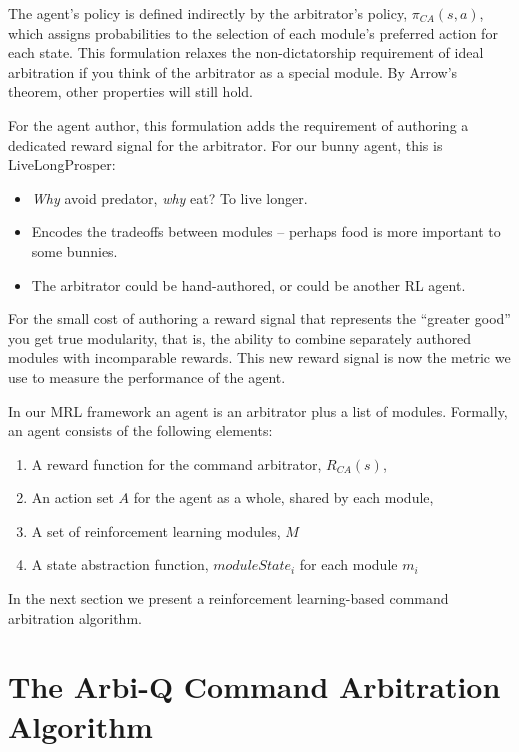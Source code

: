 The agent's policy is defined indirectly by the arbitrator's policy, $\pi_{CA}(s, a)$, which assigns probabilities to the selection of each module's preferred action for each state.  This formulation relaxes the non-dictatorship requirement of ideal arbitration if you think of the arbitrator as a special module.  By Arrow's theorem, other properties will still hold.

For the agent author, this formulation adds the requirement of authoring a dedicated reward signal for the arbitrator.  For our bunny agent, this is LiveLongProsper:

\begin{itemize}
\item {\em Why} avoid predator, {\em why} eat? To live longer.
\item Encodes the tradeoffs between modules -- perhaps food is more
  important to some bunnies.
\item The arbitrator could be hand-authored, or could be another RL
  agent.
\end{itemize}

For the small cost of authoring a reward signal that represents the ``greater good'' you get true modularity, that is, the ability to combine separately authored modules with incomparable rewards.  This new reward signal is now the metric we use to measure the performance of the agent.

In our MRL framework an agent is an arbitrator plus a list of modules. Formally, an agent consists of the following elements:

\begin{enumerate}
\item A reward function for the command arbitrator, $R_{CA}(s)$,
\item An action set $A$ for the agent as a whole, shared by each module,
\item A set of reinforcement learning modules, $M$
\item A state abstraction function, $moduleState_i$ for each module $m_i$
\end{enumerate}

In the next section we present a reinforcement learning-based command arbitration algorithm.

\section{The Arbi-Q Command Arbitration Algorithm}\label{sec:mrl-arbiq}

